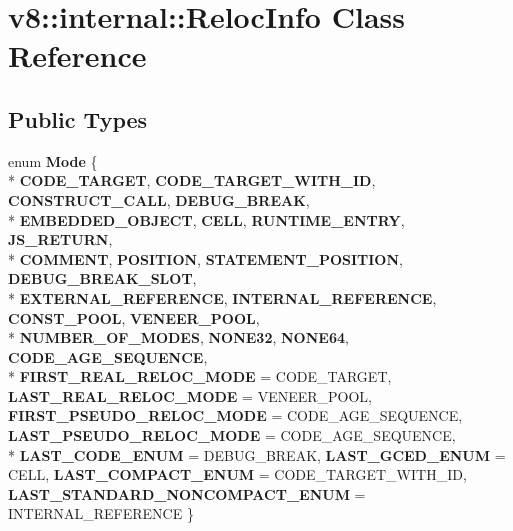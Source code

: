 \hypertarget{classv8_1_1internal_1_1_reloc_info}{}\section{v8\+:\+:internal\+:\+:Reloc\+Info Class Reference}
\label{classv8_1_1internal_1_1_reloc_info}
\subsection*{Public Types}
\begin{DoxyCompactItemize}
\item 
\hypertarget{classv8_1_1internal_1_1_reloc_info_a86a473758194fc2e4bf836e53a6db856}{}enum {\bfseries Mode} \{ \\*
{\bfseries C\+O\+D\+E\+\_\+\+T\+A\+R\+G\+E\+T}, 
{\bfseries C\+O\+D\+E\+\_\+\+T\+A\+R\+G\+E\+T\+\_\+\+W\+I\+T\+H\+\_\+\+I\+D}, 
{\bfseries C\+O\+N\+S\+T\+R\+U\+C\+T\+\_\+\+C\+A\+L\+L}, 
{\bfseries D\+E\+B\+U\+G\+\_\+\+B\+R\+E\+A\+K}, 
\\*
{\bfseries E\+M\+B\+E\+D\+D\+E\+D\+\_\+\+O\+B\+J\+E\+C\+T}, 
{\bfseries C\+E\+L\+L}, 
{\bfseries R\+U\+N\+T\+I\+M\+E\+\_\+\+E\+N\+T\+R\+Y}, 
{\bfseries J\+S\+\_\+\+R\+E\+T\+U\+R\+N}, 
\\*
{\bfseries C\+O\+M\+M\+E\+N\+T}, 
{\bfseries P\+O\+S\+I\+T\+I\+O\+N}, 
{\bfseries S\+T\+A\+T\+E\+M\+E\+N\+T\+\_\+\+P\+O\+S\+I\+T\+I\+O\+N}, 
{\bfseries D\+E\+B\+U\+G\+\_\+\+B\+R\+E\+A\+K\+\_\+\+S\+L\+O\+T}, 
\\*
{\bfseries E\+X\+T\+E\+R\+N\+A\+L\+\_\+\+R\+E\+F\+E\+R\+E\+N\+C\+E}, 
{\bfseries I\+N\+T\+E\+R\+N\+A\+L\+\_\+\+R\+E\+F\+E\+R\+E\+N\+C\+E}, 
{\bfseries C\+O\+N\+S\+T\+\_\+\+P\+O\+O\+L}, 
{\bfseries V\+E\+N\+E\+E\+R\+\_\+\+P\+O\+O\+L}, 
\\*
{\bfseries N\+U\+M\+B\+E\+R\+\_\+\+O\+F\+\_\+\+M\+O\+D\+E\+S}, 
{\bfseries N\+O\+N\+E32}, 
{\bfseries N\+O\+N\+E64}, 
{\bfseries C\+O\+D\+E\+\_\+\+A\+G\+E\+\_\+\+S\+E\+Q\+U\+E\+N\+C\+E}, 
\\*
{\bfseries F\+I\+R\+S\+T\+\_\+\+R\+E\+A\+L\+\_\+\+R\+E\+L\+O\+C\+\_\+\+M\+O\+D\+E} = C\+O\+D\+E\+\_\+\+T\+A\+R\+G\+E\+T, 
{\bfseries L\+A\+S\+T\+\_\+\+R\+E\+A\+L\+\_\+\+R\+E\+L\+O\+C\+\_\+\+M\+O\+D\+E} = V\+E\+N\+E\+E\+R\+\_\+\+P\+O\+O\+L, 
{\bfseries F\+I\+R\+S\+T\+\_\+\+P\+S\+E\+U\+D\+O\+\_\+\+R\+E\+L\+O\+C\+\_\+\+M\+O\+D\+E} = C\+O\+D\+E\+\_\+\+A\+G\+E\+\_\+\+S\+E\+Q\+U\+E\+N\+C\+E, 
{\bfseries L\+A\+S\+T\+\_\+\+P\+S\+E\+U\+D\+O\+\_\+\+R\+E\+L\+O\+C\+\_\+\+M\+O\+D\+E} = C\+O\+D\+E\+\_\+\+A\+G\+E\+\_\+\+S\+E\+Q\+U\+E\+N\+C\+E, 
\\*
{\bfseries L\+A\+S\+T\+\_\+\+C\+O\+D\+E\+\_\+\+E\+N\+U\+M} = D\+E\+B\+U\+G\+\_\+\+B\+R\+E\+A\+K, 
{\bfseries L\+A\+S\+T\+\_\+\+G\+C\+E\+D\+\_\+\+E\+N\+U\+M} = C\+E\+L\+L, 
{\bfseries L\+A\+S\+T\+\_\+\+C\+O\+M\+P\+A\+C\+T\+\_\+\+E\+N\+U\+M} = C\+O\+D\+E\+\_\+\+T\+A\+R\+G\+E\+T\+\_\+\+W\+I\+T\+H\+\_\+\+I\+D, 
{\bfseries L\+A\+S\+T\+\_\+\+S\+T\+A\+N\+D\+A\+R\+D\+\_\+\+N\+O\+N\+C\+O\+M\+P\+A\+C\+T\+\_\+\+E\+N\+U\+M} = I\+N\+T\+E\+R\+N\+A\+L\+\_\+\+R\+E\+F\+E\+R\+E\+N\+C\+E
 \}\label{classv8_1_1internal_1_1_reloc_info_a86a473758194fc2e4bf836e53a6db856}

\end{DoxyCompactItemize}
